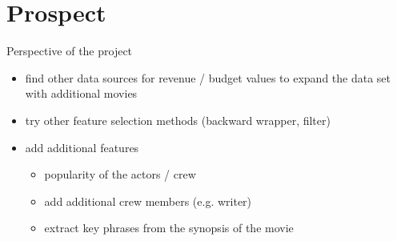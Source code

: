 \section{Prospect}
Perspective of the project
\label{cha:prospect}
\begin{itemize}
	\item find other data sources for revenue / budget values to expand the data set with additional movies
	\item try other feature selection methods (backward wrapper, filter)
	\item add additional features
	\begin{itemize}
		\item popularity of the actors / crew
		\item add additional crew members (e.g. writer)
		\item extract key phrases from the synopsis of the movie
	\end{itemize}
\end{itemize}